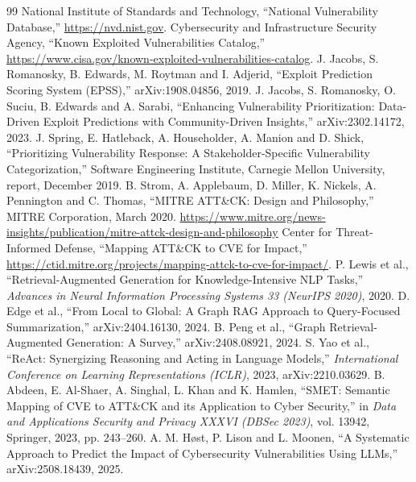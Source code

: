 \documentclass[12pt, a4paper]{article}
\begin{document}
\vspace{1cm}
\begin{thebibliography}{99}
 National Institute of Standards and Technology, ``National Vulnerability Database,'' \url{https://nvd.nist.gov}.
 Cybersecurity and Infrastructure Security Agency, ``Known Exploited Vulnerabilities Catalog,'' \url{https://www.cisa.gov/known-exploited-vulnerabilities-catalog}.
 J. Jacobs, S. Romanosky, B. Edwards, M. Roytman and I. Adjerid, ``Exploit Prediction Scoring System (EPSS),'' arXiv:1908.04856, 2019.
 J. Jacobs, S. Romanosky, O. Suciu, B. Edwards and A. Sarabi, ``Enhancing Vulnerability Prioritization: Data-Driven Exploit Predictions with Community-Driven Insights,'' arXiv:2302.14172, 2023.
 J. Spring, E. Hatleback, A. Householder, A. Manion and D. Shick, ``Prioritizing Vulnerability Response: A Stakeholder-Specific Vulnerability Categorization,'' Software Engineering Institute, Carnegie Mellon University, report, December 2019.
 B. Strom, A. Applebaum, D. Miller, K. Nickels, A. Pennington and C. Thomas, ``MITRE ATT\&CK: Design and Philosophy,'' MITRE Corporation, March 2020. \url{https://www.mitre.org/news-insights/publication/mitre-attck-design-and-philosophy}
 Center for Threat-Informed Defense, ``Mapping ATT\&CK to CVE for Impact,'' \url{https://ctid.mitre.org/projects/mapping-attck-to-cve-for-impact/}.
 P. Lewis et al., ``Retrieval-Augmented Generation for Knowledge-Intensive NLP Tasks,'' \textit{Advances in Neural Information Processing Systems 33 (NeurIPS 2020)}, 2020.
 D. Edge et al., ``From Local to Global: A Graph RAG Approach to Query-Focused Summarization,'' arXiv:2404.16130, 2024.
 B. Peng et al., ``Graph Retrieval-Augmented Generation: A Survey,'' arXiv:2408.08921, 2024.
 S. Yao et al., ``ReAct: Synergizing Reasoning and Acting in Language Models,'' \textit{International Conference on Learning Representations (ICLR)}, 2023, arXiv:2210.03629.
 B. Abdeen, E. Al-Shaer, A. Singhal, L. Khan and K. Hamlen, ``SMET: Semantic Mapping of CVE to ATT\&CK and its Application to Cyber Security,'' in \textit{Data and Applications Security and Privacy XXXVI (DBSec 2023)}, vol. 13942, Springer, 2023, pp. 243--260.
 A. M. H{\o}st, P. Lison and L. Moonen, ``A Systematic Approach to Predict the Impact of Cybersecurity Vulnerabilities Using LLMs,'' arXiv:2508.18439, 2025.

\end{thebibliography}
\end{document}
